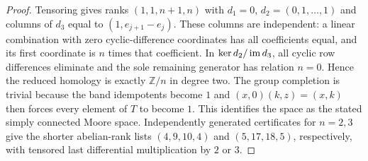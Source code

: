 \begin{proof}
Tensoring gives ranks $(1,1,n+1,n)$ with
$d_1=0$, $d_2=(0,1,\ldots,1)$ and columns of $d_3$ equal to
$(1,e_{j+1}-e_j)$.  These columns are independent: a linear
combination with zero cyclic-difference coordinates has all
coefficients equal, and its first coordinate is $n$ times that
coefficient.  In $\ker d_2/\operatorname{im} d_3$, all cyclic row differences
eliminate and the sole remaining generator has relation $n=0$.
Hence the reduced homology is exactly $\mathbb Z/n$ in degree two.
The group completion is trivial because the band idempotents become
$1$ and $(x,0)(k,z)=(x,k)$ then forces every element of $T$ to
become $1$.  This identifies the space as the stated simply connected
Moore space.  Independently generated certificates for $n=2,3$
give the shorter abelian-rank lists $(4,9,10,4)$ and $(5,17,18,5)$,
respectively, with tensored last differential multiplication by
$2$ or $3$.
\end{proof}

